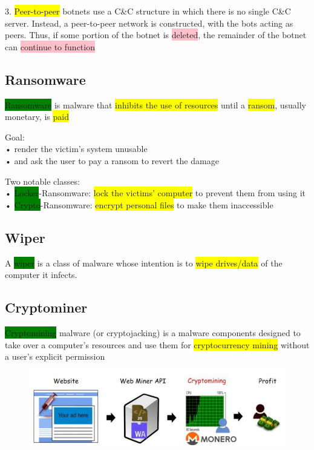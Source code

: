 \documentclass[]{project_plan}
\begin{document}
3. \colorbox{yellow}{Peer-to-peer} botnets use a C\&C structure in which there is no single C\&C server. Instead, a
peer-to-peer network is constructed, with the bots acting as peers. Thus, if some portion of the
botnet is \colorbox{pink}{deleted}, the remainder of the botnet can \colorbox{pink}{continue to function}

\subsection{Ransomware}

\colorbox{green}{Ransomware} is malware that \colorbox{yellow}{inhibits the use of resources} until a \colorbox{yellow}{ransom}, usually
monetary, is \colorbox{yellow}{paid}

Goal:\\
• render the victim’s system unusable\\
• and ask the user to pay a ransom to revert the damage

Two notable classes:\\
• \colorbox{green}{Locker}-Ransomware: \colorbox{yellow}{lock the victims’ computer} to prevent them from using it\\
• \colorbox{green}{Crypto}-Ransomware: \colorbox{yellow}{encrypt personal files} to make them inaccessible

\subsection{Wiper}
A \colorbox{green}{wiper} is a class of malware whose intention is to \colorbox{yellow}{wipe drives/data} of the computer it infects.

\subsection{Cryptominer}
\colorbox{green}{Cryptomining} malware (or cryptojacking) is a malware components designed to take
over a computer’s resources and use them for \colorbox{yellow}{cryptocurrency mining} without a user’s
explicit permission

\begin{figure}[H]
  \centering
  \includegraphics*[width=\linewidth]{cryptominers.png}
\end{figure}
\end{document}
